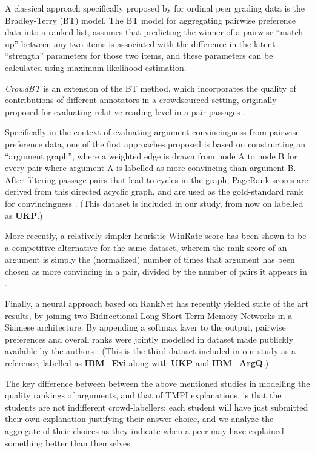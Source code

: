 \documentclass[notitlepage,12pt]{jedm}
\begin{document}
A classical approach specifically proposed by \cite{raman_methods_2014} for 
ordinal peer grading data is the Bradley-Terry (BT) model.
The BT model \cite{bradley_rank_1952} for aggregating pairwise preference data 
into a ranked list, assumes that predicting the winner of a pairwise 
``match-up'' between any two items is associated with the difference in the 
latent ``strength'' parameters for those two items, and these parameters can be 
calculated using maximum likelihood estimation.

\textit{CrowdBT} is an extension of the BT method, which incorporates the 
quality of contributions of different annotators in a crowdsourced setting, 
originally proposed for evaluating relative reading level in a pair passages 
\cite{chen_pairwise_2013}. 

Specifically in the context of evaluating argument convincingness from pairwise 
preference data, one of the first approaches proposed is based on constructing 
an ``argument graph'', where a weighted edge is drawn from node A to node B for 
every pair where argument A is labelled as more convincing than argument B. 
After filtering passage pairs that lead to cycles in the graph, PageRank scores 
are derived from this directed acyclic graph, and are used as the gold-standard 
rank for convincingness \cite{habernal_which_2016}.
(This dataset is included in our study, from now on labelled as \textbf{UKP}.)

More recently, a relatively simpler heuristic WinRate score has been shown to 
be a competitive alternative for the same dataset, wherein the rank score of an 
argument is simply the (normalized) number of times that argument has been 
chosen as more convincing in a pair, divided by the number of pairs it appears 
in \cite{potash_ranking_2019}.

Finally, a neural approach based on RankNet has recently yielded state of the 
art results, by joining two Bidirectional Long-Short-Term Memory Networks in a 
Siamese architecture. By appending a softmax layer to the output, pairwise 
preferences and overall ranks were jointly modelled in 
dataset made publickly available by the authors \cite{gleize_are_2019}.
(This is the third dataset included in our study as a reference, labelled as 
\textbf{IBM\_Evi} along with \textbf{UKP} and \textbf{IBM\_ArgQ}.)

The key difference between between the above mentioned studies 
in modelling the quality rankings of arguments, and that of TMPI explanations, 
is that the students are not indifferent crowd-labellers: each student will 
have just submitted their own explanation justifying their answer choice, and 
we analyze the aggregate of their choices as they indicate when a peer may have 
explained something better than themselves.
\end{document}
